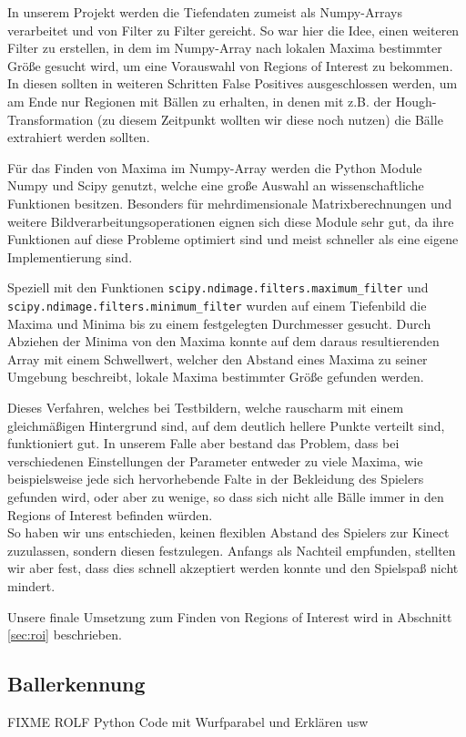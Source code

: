 \documentclass[12pt,a4paper,ngerman]{scrartcl}
\begin{document}
In unserem Projekt werden die Tiefendaten zumeist als Numpy-Arrays verarbeitet und von Filter zu Filter gereicht. So war hier die Idee, einen weiteren Filter zu erstellen, in dem im Numpy-Array nach lokalen Maxima bestimmter Größe gesucht wird, um eine Vorauswahl von Regions of Interest zu bekommen. In diesen sollten in weiteren Schritten False Positives ausgeschlossen werden, um am Ende nur Regionen mit Bällen zu erhalten, in denen mit z.B. der Hough-Transformation (zu diesem Zeitpunkt wollten wir diese noch nutzen) die Bälle extrahiert werden sollten.

Für das Finden von Maxima im Numpy-Array werden die Python Module Numpy\cite{numpy} und Scipy\cite{scipy} genutzt, welche eine große Auswahl an wissenschaftliche Funktionen besitzen. Besonders für mehrdimensionale Matrixberechnungen und weitere Bildverarbeitungsoperationen eignen sich diese Module sehr gut, da ihre Funktionen auf diese Probleme optimiert sind und meist schneller als eine eigene Implementierung sind.

Speziell mit den Funktionen {\tt scipy.ndimage.filters.maximum\_filter} und\\ {\tt scipy.ndimage.filters.minimum\_filter} wurden auf einem Tiefenbild die Maxima und Minima bis zu einem festgelegten Durchmesser gesucht. Durch Abziehen der Minima von den Maxima konnte auf dem daraus resultierenden Array mit einem Schwellwert, welcher den Abstand eines Maxima zu seiner Umgebung beschreibt, lokale Maxima bestimmter Größe gefunden werden.

Dieses Verfahren, welches bei Testbildern, welche rauscharm mit einem gleichmäßigen Hintergrund sind, auf dem deutlich hellere Punkte verteilt sind, funktioniert gut. In unserem Falle aber bestand das Problem, dass bei verschiedenen Einstellungen der Parameter entweder zu viele Maxima, wie beispielsweise jede sich hervorhebende Falte in der Bekleidung des Spielers gefunden wird, oder aber zu wenige, so dass sich nicht alle Bälle immer in den Regions of Interest befinden würden.\\
So haben wir uns entschieden, keinen flexiblen Abstand des Spielers zur Kinect zuzulassen, sondern diesen festzulegen. Anfangs als Nachteil empfunden, stellten wir aber fest, dass dies schnell akzeptiert werden konnte und den Spielspaß nicht mindert.

Unsere finale Umsetzung zum Finden von Regions of Interest wird in Abschnitt \ref{sec:roi} beschrieben.

\subsection{Ballerkennung}
{\color{red} FIXME ROLF Python Code mit Wurfparabel und Erklären usw}
\end{document}
